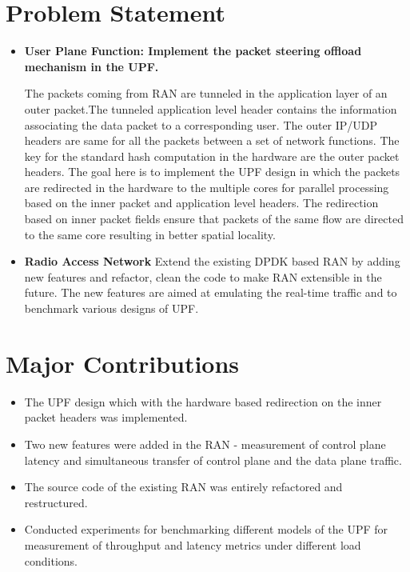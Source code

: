 \section{Problem Statement}
\begin{itemize}
	\item \textbf{User Plane Function: Implement the packet steering offload  mechanism in the UPF.} 
	
	The packets coming from RAN are tunneled in the application layer of an outer 
	packet.The tunneled application level header  contains the information 
	associating the data packet to a corresponding user. The outer IP/UDP headers
 	are same for all the packets between a set of network functions. The key for
	the standard hash computation in the hardware  are the outer packet headers.
	The goal here is to implement the UPF design in which the packets are
	redirected in the hardware to the multiple cores for parallel processing
	based on the inner packet and application level headers. The redirection based on inner packet fields ensure that packets of the same flow are directed to the same core resulting in better spatial locality.
	\item \textbf{Radio Access Network}  Extend the existing DPDK based RAN by adding new features and refactor, clean the code to make RAN extensible in the future.  The new features are aimed at emulating the real-time traffic and to benchmark various designs of UPF.  
\end{itemize}

\section{Major Contributions}
\begin{itemize}
	\item The UPF design which with the hardware based redirection on the inner packet headers was implemented. 
	\item Two new features were added in the RAN - measurement of control plane latency and simultaneous transfer of control plane and the data plane traffic.
	\item The source code of the existing RAN was entirely refactored and restructured.
	\item Conducted experiments for benchmarking different models of the UPF for measurement of throughput and latency metrics under different load conditions.
\end{itemize}
